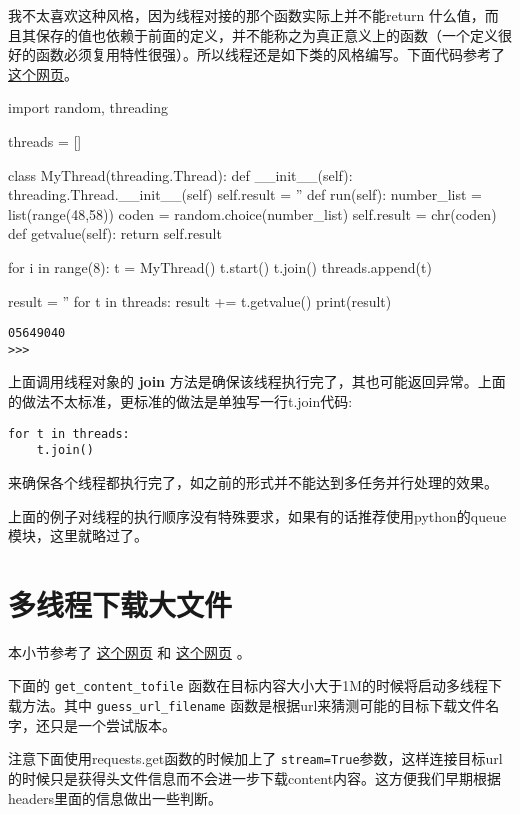 \documentclass[12pt,oneside]{book}
\begin{document}
\begin{common-format}
我不太喜欢这种风格，因为线程对接的那个函数实际上并不能return 什么值，而且其保存的值也依赖于前面的定义，并不能称之为真正意义上的函数（一个定义很好的函数必须复用特性很强）。所以线程还是如下类的风格编写。下面代码参考了 \href{http://www.ibm.com/developerworks/aix/library/au-threadingpython/index.html}{这个网页}。

\begin{tcbpython}[]
import random, threading

threads = []

class MyThread(threading.Thread):
    def __init__(self):
        threading.Thread.__init__(self)
        self.result = ''
    def run(self):
        number_list = list(range(48,58))
        coden = random.choice(number_list)
        self.result = chr(coden)
    def getvalue(self):
        return self.result


for i in range(8):
    t = MyThread()
    t.start()
    t.join()
    threads.append(t)

result = ''
for t in threads:
    result += t.getvalue()
print(result)
\end{tcbpython}

\begin{Verbatim}
05649040
>>> 
\end{Verbatim}

上面调用线程对象的 \textbf{join} 方法是确保该线程执行完了，其也可能返回异常。上面的做法不太标准，更标准的做法是单独写一行t.join代码: 

\begin{Verbatim}
for t in threads:
    t.join()
\end{Verbatim}
来确保各个线程都执行完了，如之前的形式并不能达到多任务并行处理的效果。

上面的例子对线程的执行顺序没有特殊要求，如果有的话推荐使用python的queue模块，这里就略过了。

\section{多线程下载大文件}
本小节参考了 \href{http://stackoverflow.com/questions/13973188/requests-with-multiple-connections}{这个网页} 和 \href{http://stackoverflow.com/questions/16694907/how-to-download-large-file-in-python-with-requests-py}{这个网页} 。

下面的 \verb+get_content_tofile+ 函数在目标内容大小大于1M的时候将启动多线程下载方法。其中 \verb+guess_url_filename+ 函数是根据url来猜测可能的目标下载文件名字，还只是一个尝试版本。

注意下面使用requests.get函数的时候加上了 \verb+stream=True+参数，这样连接目标url的时候只是获得头文件信息而不会进一步下载content内容。这方便我们早期根据headers里面的信息做出一些判断。


\end{common-format}
\end{document}
